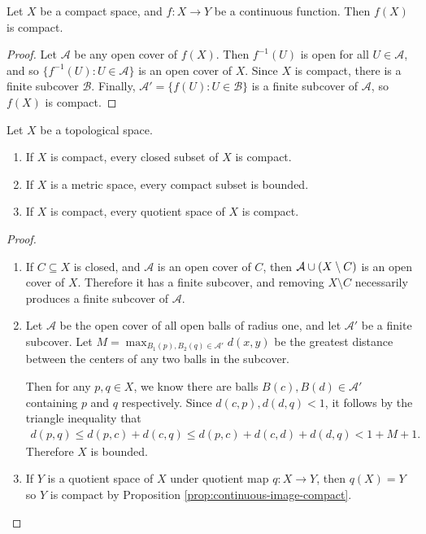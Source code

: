 \begin{prop}\label{prop:continuous-image-compact}
    Let $X$ be a compact space, and $f: X \to Y$ be a continuous function. Then $f(X)$ is compact.
\end{prop}

\begin{proof}
    Let $\mathcal{A}$ be any open cover of $f(X)$. Then $f^{-1}(U)$ is open for all $U \in \mathcal{A}$, and so $\{f^{-1}(U): U \in \mathcal{A}\}$ is an open cover of $X$. Since $X$ is compact, there is a finite subcover $\mathcal{B}$. Finally, $\mathcal{A}' = \{f(U) : U \in \mathcal{B}\}$ is a finite subcover of $\mathcal{A}$, so $f(X)$ is compact.
\end{proof}

\begin{prop}\label{prop:compactness}Let $X$ be a topological space.\proofbreak
    \begin{enumerate}
        \item If $X$ is compact, every closed subset of $X$ is compact.
        \item If $X$ is a metric space, every compact subset is bounded.
        \item If $X$ is compact, every quotient space of $X$ is compact.
    \end{enumerate}
\end{prop}

\begin{proof}\proofbreak
    \begin{enumerate}
        \item If $C \subseteq X$ is closed, and $\mathcal{A}$ is an open cover of $C$, then $\mathcal{A} \cup (X\setminus C)$ is an open cover of $X$. Therefore it has a finite subcover, and removing $X \setminus C$ necessarily produces a finite subcover of $\mathcal{A}$.
        \item Let $\mathcal{A}$ be the open cover of all open balls of radius one, and let $\mathcal{A}'$ be a finite subcover. Let $M = \max_{B_1(p),B_2(q)\in \mathcal{A'}}d(x, y)$ be the greatest distance between the centers of any two balls in the subcover.

        Then for any $p, q \in X$, we know there are balls $B(c), B(d) \in \mathcal{A'}$ containing $p$ and $q$ respectively. Since $d(c, p), d(d, q) < 1$, it follows by the triangle inequality that
        \begin{align*}
            d(p, q) \leq d(p, c) + d(c, q) \leq d(p, c) + d(c, d) + d(d, q) < 1 + M + 1.
        \end{align*}
        Therefore $X$ is bounded.
        \item If $Y$ is a quotient space of $X$ under quotient map $q: X \to Y$, then $q(X) = Y$ so $Y$ is compact by Proposition \ref{prop:continuous-image-compact}.
    \end{enumerate}
\end{proof}

